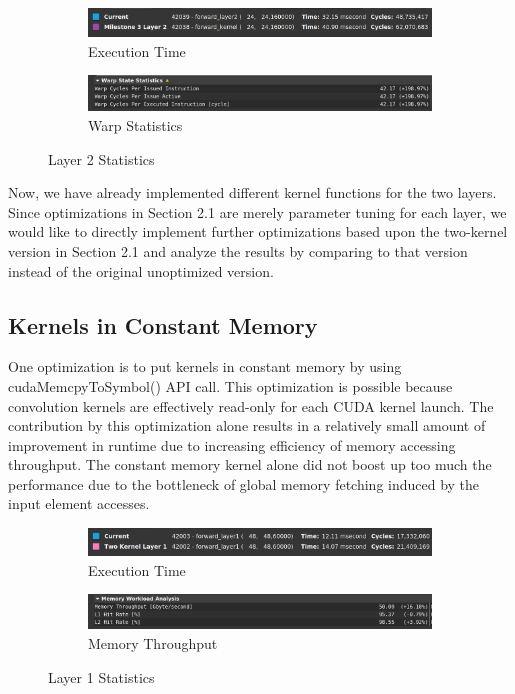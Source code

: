 \documentclass{article}
\begin{document}
\begin{figure}[H]
    \centering
    \begin{subfigure}[b]{\linewidth}
        \includegraphics[width=\linewidth]{2kern_layer2_runtime}
        \caption{Execution Time}
    \end{subfigure}
    \begin{subfigure}[b]{\linewidth}
        \includegraphics[width=\linewidth]{2kern_layer2_warp}
        \caption{Warp Statistics}
    \end{subfigure}
    \caption{Layer 2 Statistics}
\end{figure}

\par
Now, we have already implemented different kernel functions for the two layers. Since optimizations in Section 2.1
are merely parameter tuning for each layer, we would like to directly implement further optimizations based
upon the two-kernel version in Section 2.1 and analyze the results by comparing to that version instead of
the original unoptimized version.

\subsection{Kernels in Constant Memory}
One optimization is to put kernels in constant memory by using
cudaMemcpyToSymbol() API call. This optimization is possible because convolution
kernels are
effectively read-only for each CUDA kernel launch. The contribution by this
optimization alone results in a relatively small amount of improvement in runtime
due to increasing efficiency of memory accessing throughput. The constant memory
kernel alone did not boost up too much the performance due to the bottleneck
of global memory fetching induced by the input element accesses.

\begin{figure}[H]
    \centering
    \begin{subfigure}[b]{\linewidth}
        \includegraphics[width=\linewidth]{const_layer1_runtime}
        \caption{Execution Time}
    \end{subfigure}
    \begin{subfigure}[b]{\linewidth}
        \includegraphics[width=\linewidth]{const_layer1_mem}
        \caption{Memory Throughput}
    \end{subfigure}
    \caption{Layer 1 Statistics}
\end{figure}
\end{document}
